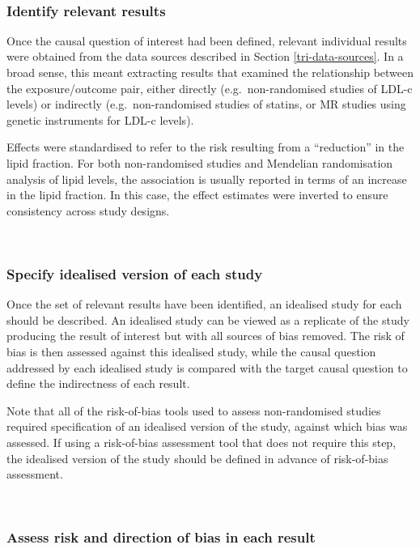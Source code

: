 \documentclass[a4paper, twoside]{templates/ociamthesis}
\begin{document}
~

\hypertarget{identify-relevant-results}{%
\subsubsection{Identify relevant results}\label{identify-relevant-results}}

Once the causal question of interest had been defined, relevant individual results were obtained from the data sources described in Section \ref{tri-data-sources}. In a broad sense, this meant extracting results that examined the relationship between the exposure/outcome pair, either directly (e.g.~non-randomised studies of LDL-c levels) or indirectly (e.g.~non-randomised studies of statins, or MR studies using genetic instruments for LDL-c levels).

Effects were standardised to refer to the risk resulting from a ``reduction'' in the lipid fraction. For both non-randomised studies and Mendelian randomisation analysis of lipid levels, the association is usually reported in terms of an increase in the lipid fraction. In this case, the effect estimates were inverted to ensure consistency across study designs.

~

\hypertarget{specify-idealised-version-of-each-study}{%
\subsubsection{Specify idealised version of each study}\label{specify-idealised-version-of-each-study}}

Once the set of relevant results have been identified, an idealised study for each should be described. An idealised study can be viewed as a replicate of the study producing the result of interest but with all sources of bias removed. The risk of bias is then assessed against this idealised study, while the causal question addressed by each idealised study is compared with the target causal question to define the indirectness of each result.

Note that all of the risk-of-bias tools used to assess non-randomised studies required specification of an idealised version of the study, against which bias was assessed. If using a risk-of-bias assessment tool that does not require this step, the idealised version of the study should be defined in advance of risk-of-bias assessment.

~

\hypertarget{assess-risk-and-direction-of-bias-in-each-result}{%
\subsubsection{Assess risk and direction of bias in each result}\label{assess-risk-and-direction-of-bias-in-each-result}}
\end{document}
